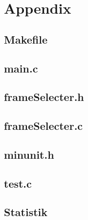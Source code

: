 \section{Appendix}

\subsection{Makefile}

\pagebreak

\subsection{main.c}

\pagebreak

\subsection{frameSelecter.h}

\pagebreak

\subsection{frameSelecter.c}

\pagebreak

\subsection{minunit.h}

\pagebreak

\subsection{test.c}
\label{app:test}

\pagebreak

\subsection{Statistik}
\label{app:statestik}


\pagebreak